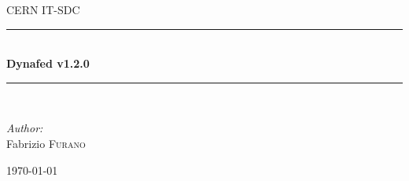 \documentclass[12pt]{article} %
\begin{document}

\begin{titlepage}

\newcommand{\HRule}{\rule{\linewidth}{0.5mm}} %

\center %

\textsc{\LARGE CERN IT-SDC}\\[1.5cm] %

\HRule \\[0.4cm]
{ \huge \bfseries Dynafed v1.2.0}\\[0.4cm] %
\HRule \\[1.5cm]

\begin{minipage}{0.4\textwidth}
\begin{flushleft} \large
\emph{Author:}\\
Fabrizio \textsc{Furano} \\ %
\end{flushleft}
\end{minipage}

{\large \today}\\[3cm] %




\vfill %

\end{titlepage}
\end{document}
